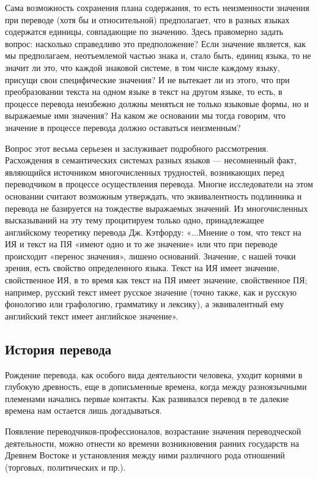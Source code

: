 Сама возможность сохранения плана содержания, то есть неизменности значения при переводе (хотя бы и относительной) предполагает, что в разных языках содержатся единицы, совпадающие по значению. Здесь правомерно задать вопрос: насколько справедливо это предположение? Если значение является, как мы предполагаем, неотъемлемой частью знака и, стало быть, единиц языка, то не значит ли это, что каждой знаковой системе, в том числе каждому языку, присущи свои специфические значения? И не вытекает ли из этого, что при преобразовании текста на одном языке в текст на другом языке, то есть, в процессе перевода неизбежно должны меняться не только языковые формы, но и выражаемые ими значения? На каком же основании мы тогда говорим, что значение в процессе перевода должно оставаться неизменным?

Вопрос этот весьма серьезен и заслуживает подробного рассмотрения. Расхождения в семантических системах разных языков --- несомненный факт, являющийся источником многочисленных трудностей, возникающих перед переводчиком в процессе осуществления перевода. Многие исследователи на этом основании считают возможным утверждать, что эквивалентность подлинника и перевода не базируется на тождестве выражаемых значений. Из многочисленных высказываний на эту тему процитируем только одно, принадлежащее английскому теоретику перевода Дж. Кэтфорду: «...Мнение о том, что текст на ИЯ и текст на ПЯ «имеют одно и то же значение» или что при переводе происходит «перенос значения», лишено оснований. Значение, с нашей точки зрения, есть свойство определенного языка. Текст на ИЯ имеет значение, свойственное ИЯ, в то время как текст на ПЯ имеет значение, свойственное ПЯ; например, русский текст имеет русское значение (точно также, как и русскую фонологию или графологию, грамматику и лексику), а эквивалентный ему английский текст имеет английское значение».

\subsection*{История перевода}

Рождение перевода, как особого вида деятельности человека, уходит корнями в глубокую древность, еще в дописьменные времена, когда между разноязычными племенами начались первые контакты. Как развивался перевод в те далекие времена нам остается лишь догадываться.

Появление переводчиков-профессионалов, возрастание значения переводческой деятельности, можно отнести ко времени возникновения ранних государств на Древнем Востоке и установления между ними различного рода отношений (торговых, политических и пр.).

